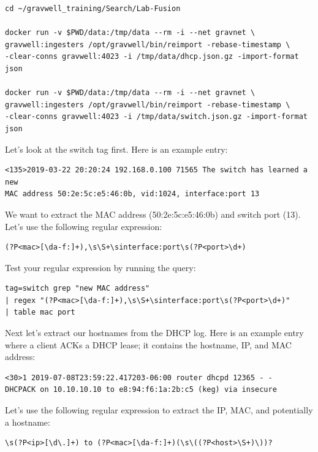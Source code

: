 \begin{Verbatim}[breaklines=true]
cd ~/gravwell_training/Search/Lab-Fusion

docker run -v $PWD/data:/tmp/data --rm -i --net gravnet \
gravwell:ingesters /opt/gravwell/bin/reimport -rebase-timestamp \
-clear-conns gravwell:4023 -i /tmp/data/dhcp.json.gz -import-format json

docker run -v $PWD/data:/tmp/data --rm -i --net gravnet \
gravwell:ingesters /opt/gravwell/bin/reimport -rebase-timestamp \
-clear-conns gravwell:4023 -i /tmp/data/switch.json.gz -import-format json
\end{Verbatim}

Let's look at the switch tag first. Here is an example entry:

\begin{Verbatim}[breaklines=true]
<135>2019-03-22 20:20:24 192.168.0.100 71565 The switch has learned a new
MAC address 50:2e:5c:e5:46:0b, vid:1024, interface:port 13
\end{Verbatim}

We want to extract the MAC address (50:2e:5c:e5:46:0b) and switch
port (13). Let's use the following regular expression:

\begin{Verbatim}[breaklines=true]
(?P<mac>[\da-f:]+),\s\S+\sinterface:port\s(?P<port>\d+)
\end{Verbatim}

Test your regular expression by running the query:

\begin{Verbatim}[breaklines=true]
tag=switch grep "new MAC address"
| regex "(?P<mac>[\da-f:]+),\s\S+\sinterface:port\s(?P<port>\d+)"
| table mac port
\end{Verbatim}

Next let's extract our hostnames from the DHCP log. Here is an example
entry where a client ACKs a DHCP lease; it contains the hostname,
IP, and MAC address:

\begin{Verbatim}[breaklines=true]
<30>1 2019-07-08T23:59:22.417203-06:00 router dhcpd 12365 - - 
DHCPACK on 10.10.10.10 to e8:94:f6:1a:2b:c5 (keg) via insecure
\end{Verbatim}

Let's use the following regular expression to extract the IP, MAC, and
potentially a hostname:

\begin{Verbatim}[breaklines=true]
\s(?P<ip>[\d\.]+) to (?P<mac>[\da-f:]+)(\s\((?P<host>\S+)\))?
\end{Verbatim}


